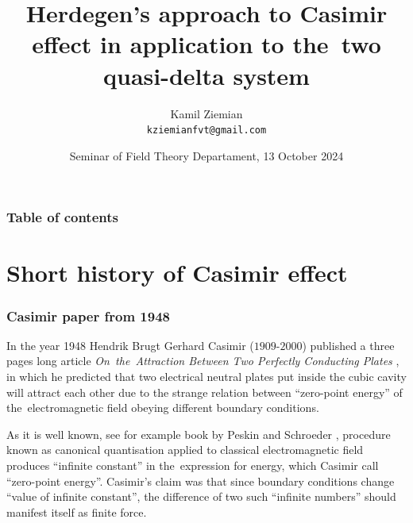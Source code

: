 \documentclass[10pt,t]{beamer}
\title{Herdegen's approach to Casimir effect in application to
  the~two quasi-delta system}
\author{Kamil Ziemian \\
  \texttt{kziemianfvt@gmail.com}}
\date[13 X 2024]{Seminar of Field Theory Departament,
  13 October 2024}
\begin{document}





\RaggedRight





\maketitle





\begin{frame}
  \frametitle{Table of contents}


  \tableofcontents %

\end{frame}










\section{Short history of Casimir effect}



\begin{frame}
  \frametitle{Casimir paper from 1948}


  In the year 1948 Hendrik Brugt Gerhard Casimir ($1909\text{-}2000$)
  published a three pages long article \textit{On~the~Attraction
    Between Two Perfectly Conducting Plates}
  \parencite{Casimir-On-the-Attraction-Between-ETC-Pub-1948}, in
  which he predicted that two electrical neutral plates put inside the
  cubic cavity will attract each other due to the strange relation between
  ``zero-point energy'' of the~electromagnetic field obeying different
  boundary conditions.

  As it is well known, see for example book by Peskin and Schroeder
  \parencite{Peskin-Schroeder-An-Introduction-to-Quantum-Field-Theory-Pub-1995},
  procedure known as canonical quantisation applied to classical
  electromagnetic field produces ``infinite constant'' in the~expression
  for energy, which Casimir call ``zero-point energy''. Casimir's claim
  was that since boundary conditions change ``value of infinite constant'',
  the difference of two such ``infinite numbers'' should manifest itself
  as finite force.

\end{frame}
\end{document}
